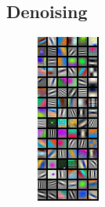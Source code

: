 \documentclass{article}
\begin{document}
\subsection{ Denoising}
\begin{figure}[ht]
  \begin{minipage}[b]{0.48\linewidth}
  	\includegraphics[width=\textwidth]{img/first.png}

\end{minipage}
\end{figure}
\end{document}
